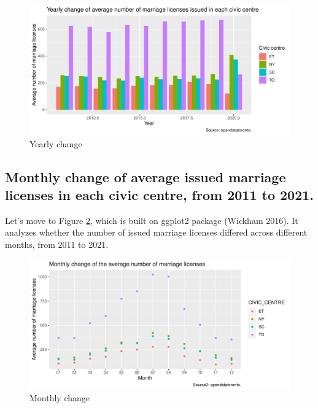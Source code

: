 \documentclass[
]{article}
\begin{document}
\begin{figure}
\centering
\includegraphics{Paper1_files/figure-latex/Figure1-1.pdf}
\caption{\label{fig:Figure1}Yearly change}
\end{figure}

\hypertarget{monthly-change-of-average-issued-marriage-licenses-in-each-civic-centre-from-2011-to-2021.}{%
\subsection{Monthly change of average issued marriage licenses in each civic centre, from 2011 to 2021.}\label{monthly-change-of-average-issued-marriage-licenses-in-each-civic-centre-from-2011-to-2021.}}

Let's move to Figure \ref{fig:Figure2}, which is built on ggplot2 package (Wickham 2016). It analyzes whether the number of issued marriage licenses differed across different months, from 2011 to 2021.

\begin{figure}
\centering
\includegraphics{Paper1_files/figure-latex/Figure2-1.pdf}
\caption{\label{fig:Figure2}Monthly change}
\end{figure}

\newpage
\end{document}
